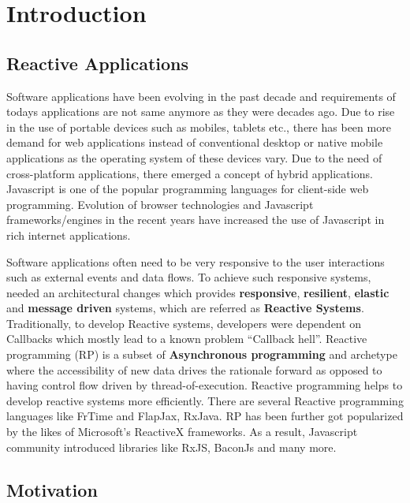 \chapter{Introduction} \label{chap:Introduction}

\section{Reactive Applications}
Software applications have been evolving in the past decade and requirements of today\textquotesingle s applications are not same anymore as they were decades ago\cite{reactiveManifesto}. 
Due to rise in the use of portable devices such as mobiles, tablets etc., there has been more demand for web applications instead of conventional desktop or native mobile applications as the operating system of these devices vary\cite{7818919}. 
Due to the need of cross-platform applications, there emerged a concept of hybrid applications. Javascript is one of the popular programming languages for client-side web programming. Evolution of browser technologies and Javascript frameworks/engines in the recent years have increased the use of Javascript in rich internet applications\cite{6068340}\cite{Sen:2013:JSR:2491411.2491447}. 

Software applications often need to be very responsive to the user interactions such as external events and data flows. 
To achieve such responsive systems, needed an architectural changes which provides \textbf{responsive}, \textbf{resilient}, \textbf{elastic} and \textbf{message driven} systems, which are referred as \textbf{Reactive Systems}\cite{reactiveManifesto}. Traditionally, to develop Reactive systems, developers were dependent on Callbacks which mostly lead to a known problem ``Callback hell''. 
Reactive programming (RP) is a subset of \textbf{Asynchronous programming} and archetype where the accessibility of new data drives the rationale forward as opposed to having control flow driven by thread-of-execution. 
Reactive programming helps to develop reactive systems more efficiently. 
There are several Reactive programming languages like FrTime\cite{Cooper2006} and FlapJax\cite{Meyerovich:2009:FPL:1639949.1640091}, RxJava\cite{rxJava}. RP has been further got popularized by the likes of Microsoft's ReactiveX frameworks\cite{reactiveX}.  As a result, Javascript community introduced libraries like RxJS\cite{rxjs}, BaconJs\cite{baconjs} and many more.


\section{Motivation}

